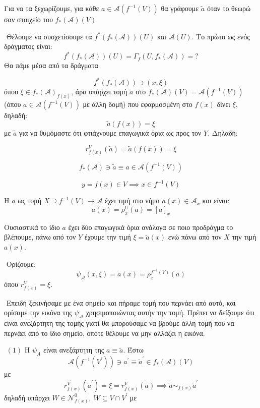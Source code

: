 \noindent Για να τα ξεχωρίζουμε, για κάθε $a \in \mathcal A(f^{-1}(V))$ θα γράφουμε $\tilde{a}$ όταν το θεωρώ σαν στοιχείο του $f_* (\mathcal A)(V)$

$ $\newline
Θέλουμε να συσχετίσουμε τα $f^*(f_*(\mathcal A))(U)$ και $\mathcal A(U)$. Το πρώτο ως  ενός δράγματος είναι:
$$f^*(f_*(\mathcal A))(U) = \Gamma_f(U,f_*(\mathcal{A})) = ?$$ Θα πάμε μέσα από τα δράγματα

$$f^*(f_*(\mathcal{A})) \ni (x,\xi)$$ όπου $\xi \in f_*(\mathcal{A})_{f(x)}$, άρα υπάρχει τομή $\tilde{a}$ στο $f_*(\mathcal{A})(V) = \mathcal{A}(f^{-1}(V))$ (όπου $a \in\mathcal{A}(f^{-1}(V))$ με άλλη δομή) που εφαρμοσμένη στο $f(x)$ δίνει $\xi$, δηλαδή:
$$\tilde{a}(f(x)) = \xi$$ με $\tilde{a}$ για να θυμόμαστε ότι φτιάχνουμε επαγωγικά όρια ως προς τον $Y$. Δηλαδή:

$$r^V_{f(x)}(\tilde{a}) = \tilde{a}(f(x)) = \xi$$

$$f_*(\mathcal A) \ni \tilde{a} \equiv a \in \mathcal{A}(f^{-1}(V))$$

$$y = f(x) \in V \implies x \in f^{-1}(V)$$

\noindent Η $a$ ως τομή $X\supseteq f^{-1}(V) \longrightarrow \mathcal{A}$ έχει τιμή στο νήμα $a(x) \in \mathcal{A}_x$ και είναι:
$$a(x) = \rho^U_x (a) = [a]_x$$

\noindent Ουσιαστικά το ίδιο $a$ έχει δύο επαγωγικά όρια ανάλογα σε ποιο προδράγμα το βλέπουμε, πάνω από τον $Y$ έχουμε την τιμή $\xi = \tilde{a}(x)$ ενώ πάνω από τον $X$ την τιμή $a(x)$.

$ $\newline
Ορίζουμε:
$$\psi_{\mathcal A}(x,\xi) = a(x) = \rho^{f^{-1}(V)}_x(a)$$ όπου $r^V_{f(x)}=\xi$.


$ $\newline
Επειδή ξεκινήσαμε με ένα σημείο και πήραμε τομή που περνάει από αυτό, και ορίσαμε την εικόνα της $\psi_{\mathcal A}$ χρησιμοποιώντας αυτήν την τομή. Πρέπει να δείξουμε ότι είναι ανεξάρτητη της τομής γιατί θα μπορούσαμε να βρούμε άλλη τομή που να περνάει από το ίδιο σημείο, οπότε θέλουμε να μην αλλάζει η εικόνα.

$ $\newline
$(1)$ Η $\psi_A$ είναι ανεξάρτητη της $a \equiv \tilde{a}$. Έστω 
$$ \mathcal{A}(f^{-1}(V^{\prime})) \ni a^{\prime} \equiv \tilde{a}^{\prime} \in f_*(\mathcal A)(V)$$ με 
$$r^{V^{\prime}}_{f(x)}(\tilde{a}^{\prime}) = \xi = r^V_{f(x)}(\tilde{a}) \implies \tilde{a} \sim_{f(x)} \tilde{a}^{\prime}$$ δηλαδή υπάρχει $W \in \mathcal{N}^0_{f(x)}, \ W \subseteq V\cap V^{\prime}$ με 


